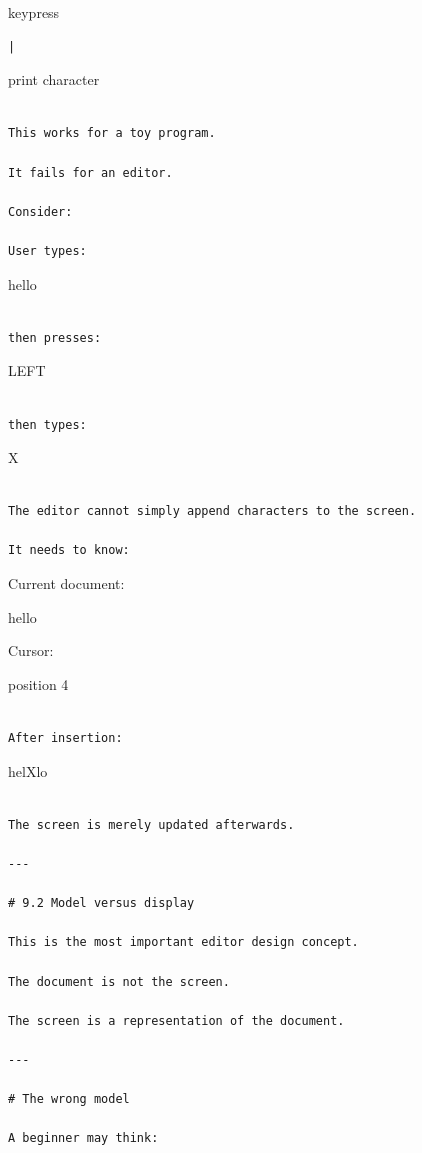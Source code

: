 \documentclass[
  oneside,
  openany]{book}
\begin{document}
keypress

\begin{verbatim}
|
\end{verbatim}

print character

\begin{verbatim}

This works for a toy program.

It fails for an editor.

Consider:

User types:
\end{verbatim}

hello

\begin{verbatim}

then presses:
\end{verbatim}

LEFT

\begin{verbatim}

then types:
\end{verbatim}

X

\begin{verbatim}

The editor cannot simply append characters to the screen.

It needs to know:
\end{verbatim}

Current document:

hello

Cursor:

position 4

\begin{verbatim}

After insertion:
\end{verbatim}

helXlo

\begin{verbatim}

The screen is merely updated afterwards.

---

# 9.2 Model versus display

This is the most important editor design concept.

The document is not the screen.

The screen is a representation of the document.

---

# The wrong model

A beginner may think:
\end{verbatim}
\end{document}
